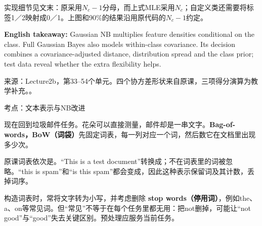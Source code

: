 实现细节见文末：原采用\(N_c-1\)分母，而上式MLE采用\(N_c\)；自定义类还需要将标签1／2映射成0／1。上图和90\%的结果沿用原代码的\(N_c-1\)约定。


\textbf{English takeaway:} Gaussian NB multiplies feature densities conditional on the class. Full Gaussian Bayes also models within-class covariance. Its decision combines a covariance-adjusted distance, distribution spread and the class prior; test data reveal whether the extra flexibility helps.


来源：Lecture2b，第33–54个单元。四个协方差形状来自原课，三项得分演算为教学补充。。








考点：文本表示与NB改进




现在回到垃圾邮件任务。花朵可以直接测量，邮件却是一串文字。\textbf{Bag-of-words，BoW（词袋）}先固定词表，每一列对应一个词，然后数它在文档里出现多少次。


原课词表依次是。“This is a test document”转换成；不在词表里的词被忽略。“this is spam”和“is this spam”都会变成，因此这种表示保留词及其计数，丢掉词序。






构造词表时，常将文字转为小写，并考虑删除 \textbf{stop words（停用词）}，例如the、a、on等常见词。但“常见”不等于在每个任务里都无用：把not删掉，可能让“not good”与“good”失去关键区别。预处理应服务当前任务。








